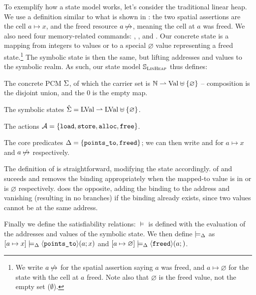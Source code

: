 To exemplify how a state model works, let's consider the traditional linear heap. We use a definition similar to what is shown in \cite{isl}: the two spatial assertions are the cell $a\mapsto x$, and the freed resource $a\not\mapsto$, meaning the cell at $a$ was freed. We also need four memory-related commands: \load, \store, \alloc{} and \free{}. Our concrete state is a mapping from integers to values or to a special $\varnothing$ value representing a freed state.\footnote{We write $a\not\mapsto$ for the spatial assertion saying $a$ was freed, and $a\mapsto\varnothing$ for the state with the cell at $a$ freed. Note also that $\varnothing$ is the freed value, not the empty set ($\emptyset$).} The symbolic state is then the same, but lifting addresses and values to the symbolic realm. As such, our state model $\mathbb S_{\textsc{LinHeap}}$ thus defines: \begin{compactitem}
 \item The concrete PCM $\Sigma$, of which the carrier set is $\mathbb N\rightharpoonup \text{Val} \uplus \{\varnothing\}$ -- composition is the disjoint union, and the $0$ is the empty map.
 \item The symbolic states $\hat{\Sigma} = \text{LVal} \rightharpoonup \text{LVal} \uplus\{\varnothing\}$.
 \item The actions ${\cal{A}}=\{\texttt{load},\texttt{store},\texttt{alloc},\texttt{free}\}$.
 \item The core predicates $\Delta=\{\texttt{points\_to}, \texttt{freed}\}$; we can then write  and  for $a\mapsto x$ and $a\not\mapsto$ respectively.
 \end{compactitem}

 The definition of \execac{} is straightforward, modifying the state accordingly. \consume{} of \pointsto{} and \freedP{} suceeds and removes the binding appropriately when the mapped-to value is in \LVal{} or is $\varnothing$ respectively. \produce{} does the opposite, adding the binding to the address and vanishing (resulting in no branches) if the binding already exists, since two values cannot be at the same address.

 Finally we define the satisfiability relations: $\models$ is defined with the evaluation of the addresses and values of the symbolic state. We then define $\models_{\Delta}$ as ${[a\mapsto x]\models_{\Delta} \left<\texttt{points\_to}\right>\!(a;x)}$ and ${[a\mapsto\varnothing]\models_{\Delta}\left<\texttt{freed}\right>\!(a;)}$.

